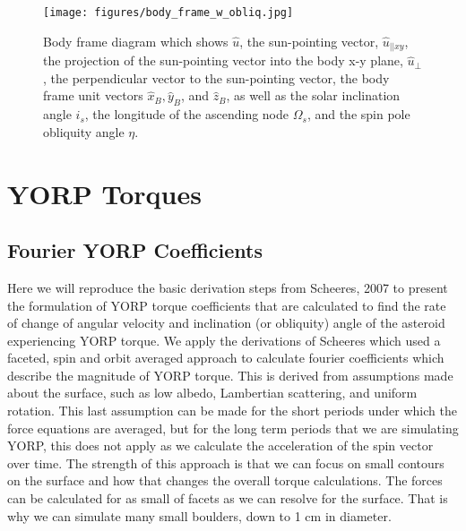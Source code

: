 \documentclass[12pt,notitlepage]{article}
\begin{document}
\begin{figure}[H]
    \centering
    \texttt{[image: figures/body\_frame\_w\_obliq.jpg]}
    \caption{Body frame diagram which shows $\hat{u}$, the sun-pointing vector, $\hat{u}_{||xy}$, the projection of the sun-pointing vector into the body x-y plane, $\hat{u}_{\perp}$, the perpendicular vector to the sun-pointing vector, the body frame unit vectors $\hat{x}_B, \hat{y}_B$, and $\hat{z}_B$, as well as the solar inclination angle $i_s$, the longitude of the ascending node $\Omega_s$, and the spin pole obliquity angle $\eta$. }
    \label{body_frame}
\end{figure}

\section{YORP Torques} \label{yorp}

\subsection{Fourier YORP Coefficients}
Here we will reproduce the basic derivation steps from Scheeres, 2007 to present the formulation of YORP torque coefficients that are calculated to find the rate of change of angular velocity and inclination (or obliquity) angle of the asteroid experiencing YORP torque.
We apply the derivations of Scheeres which used a faceted, spin and orbit averaged approach to calculate fourier coefficients which describe the magnitude of YORP torque. This is derived from assumptions made about the surface, such as low albedo, Lambertian scattering, and uniform rotation. This last assumption can be made for the short periods under which the force equations are averaged, but for the long term periods that we are simulating YORP, this does not apply as we calculate the acceleration of the spin vector over time. The strength of this approach is that we can focus on small contours on the surface and how that changes the overall torque calculations. The forces can be calculated for as small of facets as we can resolve for the surface. That is why we can simulate many small boulders, down to 1 cm in diameter. 
\end{document}
